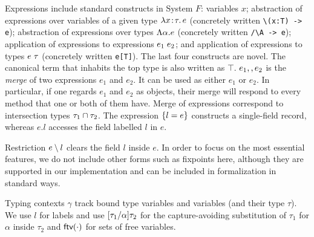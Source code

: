 Expressions include standard constructs in System
$F$: variables $ x $; abstraction of expressions over variables of a given type
$\lambda x \!:\! \tau.\, e$ (concretely written \lstinline$\(x:T) -> e$);
abstraction of expressions over types $\Lambda \alpha. e$ (concretely written \lstinline$/\A -> e$);
application of expressions to expressions $e_1 \; e_2$;
and application of expressions to types $e \; \tau$ (concretely written \lstinline$e[T]$).
The last four constructs are novel.
The canonical term that inhabits the top type is also written as $\top$.
$e_1 ,, e_2$ is the \emph{merge} of two expressions $e_1$ and $e_2$.
It can be used as either $ e_1 $ or $ e_2 $. In particular, if one regards $e_1$
and $e_2$ as objects, their merge will respond to every method that one or
both of them have. Merge of expressions correspond to intersection types
$ \tau_1 \cap \tau_2 $. The expression $ \{ l = e \} $ constructs a
single-field record, whereas $ e.l $ accesses the field labelled $ l $ in $ e $.
\begin{comment}
Note that $ e $ does not
need to be a record type in this case. For example, although the merge of two
records
\[
x = \recordCon {l_1} {e_1} \mergeOp \recordCon {l_1} {e_2}
\]
is of an intersection type, $ x.{l_1} $ still gives $ e_1 $. On the other hand,
$ x.{l_3} $ will be rejected by the type system.
\end{comment}
Restriction $e \setminus l$ clears the field $l$ inside $e$. In order to
focus on the most essential features, we do not include other forms such as
fixpoints here, although they are supported in our implementation and can
be included in formalization in standard ways.

Typing contexts $ \gamma $ track bound type variables and variables (and their
type $\tau$). We use $l$ for labels and use
$\lbrack \tau_1 / \alpha \rbrack {\tau_2}$ for the capture-avoiding substitution of
$\tau_1$ for $\alpha$ inside $\tau_2$ and $\textsf{ftv}(\cdot)$ for sets of free
variables.

\begin{comment}
\paragraph{Discussion.} A natural question the reader might ask is that why we
have excluded union types from the language. The answer is we found that
intersection types alone are enough support extensible designs. To focus on the
key features that make this language interesting, we also omit other common
constructs. For example, fixpoints can be added in standard ways.
\end{comment}


